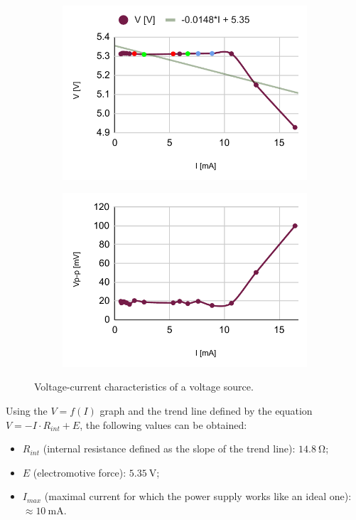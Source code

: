 \begin{figure}[H]
	\centering
	\begin{subfigure}{.5\textwidth}
		\centering
		\includegraphics[width=.99\linewidth]{schematics/chart1.pdf}
	\end{subfigure}%
	\begin{subfigure}{.5\textwidth}
		\centering
		\includegraphics[width=.99\linewidth]{schematics/chart2.pdf}
	\end{subfigure}
	\caption{Voltage-current characteristics of a voltage source.}
	\label{fig:volt-curr_osc}
\end{figure}

Using the $V=f(I)$ graph and the trend line defined by the equation $V =  - I\cdot R_{int} + E$, the following values can be obtained:
\begin{itemize}
	\item $R_{int}$ (internal resistance defined as the slope of the trend line): $\SI{14.8}{\ohm}$;
	\item $E$ (electromotive force): $\SI{5.35}{\volt}$;
	\item $I_{max}$ (maximal current for which the power supply works like an ideal one): $\approx \SI{10}{\milli\ampere}$.
\end{itemize}

